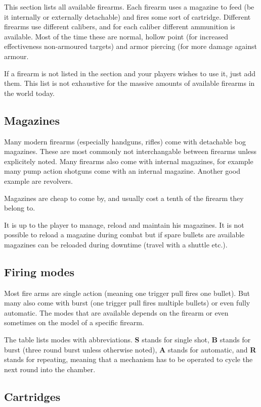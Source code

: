 This section lists all available firearms. Each firearm uses a magazine to feed
(be it internally or externally detachable) and fires some sort of cartridge.
Different firearms use different calibers, and for each caliber different
ammunition is available. Most of the time these are normal, hollow point (for
increased effectiveness non-armoured targets) and armor piercing (for more
damage against armour.

If a firearm is not listed in the section and your players wishes to use it,
just add them. This list is not exhaustive for the massive amounts of available
firearms in the world today.

\subsection{Magazines}

Many modern firearms (especially handguns, rifles) come with detachable bog
magazines. These are most commonly not interchangable between firearms unless
explicitely noted. Many firearms also come with internal magazines, for example
many pump action shotguns come with an internal magazine. Another good example
are revolvers.

Magazines are cheap to come by, and usually cost a tenth of the firearm they
belong to.

It is up to the player to manage, reload and maintain his magazines. It is not
possible to reload a magazine during combat but if spare bullets are available
magazines can be reloaded during downtime (travel with a shuttle etc.).

\subsection{Firing modes}

Most fire arms are single action (meaning one trigger pull fires one bullet).
But many also come with burst (one trigger pull fires multiple bullets) or
even fully automatic. The modes that are available depends on the firearm or
even sometimes on the model of a specific firearm.

The table lists modes with abbreviations. \textbf{S} stands for single shot,
\textbf{B} stands for burst (three round burst unless otherwise noted),
\textbf{A} stands for automatic, and \textbf{R} stands for repeating, meaning
that a mechanism has to be operated to cycle the next round into the chamber.

\subsection{Cartridges}

